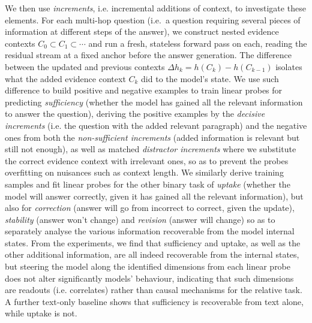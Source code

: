 We then use \emph{increments}, i.e. incremental additions of context, to investigate these elements. For each multi-hop question (i.e.\ a question requiring several pieces of information at different steps of the answer), we construct nested evidence contexts $C_0\subset C_1\subset\cdots$ and run a fresh, stateless forward pass on each, reading the residual stream at a fixed anchor before the answer generation. The difference between the updated and previous contexts $\Delta h_{k}=h(C_k)-h(C_{k-1})$ isolates what the added evidence context $C_k$ did to the model's state. 
We use such difference to build positive and negative examples to train linear probes for predicting \emph{sufficiency} (whether the model has gained all the relevant information to answer the question), deriving the positive examples by the \emph{decisive increments} (i.e. the question with the added relevant paragraph) and the negative ones from both the \emph{non-sufficient increments} (added information is relevant but still not enough), as well as matched \emph{distractor increments} where we substitute the correct evidence context with irrelevant ones, so as to prevent the probes overfitting on nuisances such as context length. We similarly derive training samples and fit linear probes for the other binary task of \emph{uptake} (whether the model will answer correctly, given it has gained all the relevant information), but also for \emph{correction} (answer will go from incorrect to correct, given the update), \emph{stability} (answer won't change) and \emph{revision} (answer will change) so as to separately analyse the various information recoverable from the model internal states. From the experiments, we find that sufficiency and uptake, as well as the other additional information, are all indeed recoverable from the internal states, but steering the model along the identified dimensions from each linear probe does not alter significantly models' behaviour, indicating that such dimensions are readouts (i.e. correlates) rather than causal mechanisms for the relative task. A further text-only baseline shows that sufficiency is recoverable from text alone, while uptake is not.
